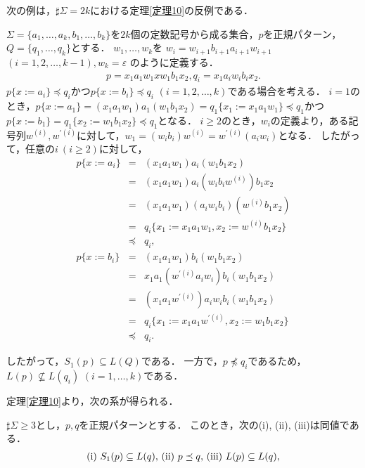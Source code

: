 次の例は，$\sharp \Sigma = 2k$における定理\ref{定理10}の反例である．
\begin{ex}\label{例題1}
$\Sigma = \{ a_{1}, \ldots , a_{k}, b_{1}, \ldots , b_{k} \}$を$2k$個の定数記号から成る集合，$p$を正規パターン，$Q = \{ q_{1}, \ldots , q_{k} \}$とする．
$w_{1}, \ldots , w_{k}$を
$w_{i} = w_{i+1}b_{i+1}a_{i+1}w_{i+1}$ $(i = 1,2, \ldots , k-1), w_{k} = \varepsilon$
のように定義する．				
\begin{eqnarray*}
p = x_{1}a_{1}w_{1}xw_{1}b_{1}x_{2},
q_{i} = x_{1}a_{i}w_{i}b_{i}x_{2}.
\end{eqnarray*}
$p \{ x:=a_{i} \} \preceq q_{i}$かつ$p \{ x:=b_{i} \} \preceq q_{i}$ $(i = 1,2, \ldots , k)$である場合を考える．
$i=1$のとき，$p \{ x:=a_{1} \} = (x_{1}a_{1}w_{1})a_{1}(w_{1}b_{1}x_{2}) = q_{1} \{ x_{1} := x_{1}a_{1}w_{1} \} \preceq q_{1}$かつ$p \{ x:=b_{1} \} = q_{1} \{ x_{2} := w_{1}b_{1}x_{2} \} \preceq q_{1}$となる．
$i \ge 2$のとき，$w_{i}$の定義より，ある記号列$w^{(i)},w^{\prime (i)}$に対して，$w_{1} = (w_{i}b_{i})w^{(i)} = w^{\prime (i)}(a_{i}w_{i})$となる．
したがって，任意の$i~(i \ge 2)$に対して， 
\begin{eqnarray*}
p \{ x:=a_{i} \} & = & (x_{1}a_{1}w_{1})a_{i}(w_{1}b_{1}x_{2})\\
& = & (x_{1}a_{1}w_{1})a_{i}(w_{i}b_{i}w^{(i)})b_{1}x_{2}\\
& = & (x_{1}a_{1}w_{1})(a_{i}w_{i}b_{i})(w^{(i)}b_{1}x_{2})\\
& = & q_{i} \{ x_{1} := x_{1}a_{1}w_{1}, x_{2} := w^{(i)}b_{1}x_{2} \}\\
& \preceq & q_{i},\\
p \{ x:=b_{i} \} & = & (x_{1}a_{1}w_{1})b_{i}(w_{1}b_{1}x_{2})\\
& = & x_{1}a_{1}(w^{\prime (i)}a_{i}w_{i})b_{i}(w_{1}b_{1}x_{2}) \\
& = & (x_{1}a_{1}w^{\prime (i)})a_{i}w_{i}b_{i}(w_{1}b_{1}x_{2}) \\
& = & q_{i} \{ x_{1} := x_{1}a_{1}w^{\prime (i)}, x_{2} := w_{1}b_{1}x_{2} \}\\
& \preceq & q_{i}.
\end{eqnarray*}

したがって，$S_{1}(p) \subseteq L(Q)$である． 
一方で，$p \not \preceq q_{i}$であるため，
$L(p) \not \subseteq L(q_{i})$ $(i=1, \ldots , k)$である．
\end{ex}

定理\ref{定理10}より，次の系が得られる．
\begin{col}
$\sharp \Sigma \ge 3$とし，$p,q$を正規パターンとする．
このとき，次の{\rm (i), (ii), (iii)}は同値である．
\[
\begin{tabular}{ll}
$(\mathrm{i})$ $S_{1}(p) \subseteq L(q),$
$(\mathrm{ii})$ $p \preceq q,$
$(\mathrm{iii})$ $L(p) \subseteq L(q),$
\end{tabular}
\]
\end{col}